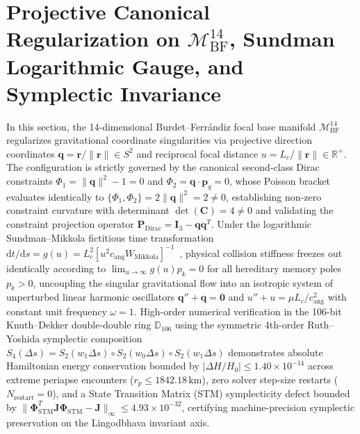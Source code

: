 \documentclass[11pt,a4paper,reqno]{article}
\theoremstyle{plain}
\theoremstyle{definition}
\theoremstyle{remark}
\numberwithin{equation}{section}
\providecommand{\diff}{\mathrm{d}}
\begin{document}
\section{Projective Canonical Regularization on \texorpdfstring{$\mathcal{M}_{\mathrm{BF}}^{14}$}{M BF 14}, Sundman Logarithmic Gauge, and Symplectic Invariance}
\label{sec:focal_manifold}

In this section, the 14-dimensional Burdet--Ferr\'{a}ndiz focal base manifold $\mathcal{M}_{\mathrm{BF}}^{14}$~\cite{burdet1969, ferrandiz1988} regularizes gravitational coordinate singularities via projective direction coordinates $\bm{q} = \bm{r}/\|\bm{r}\| \in S^2$ and reciprocal focal distance $u = L_c/\|\bm{r}\| \in \mathbb{R}^+$. The configuration is strictly governed by the canonical second-class Dirac constraints $\Phi_1 = \|\bm{q}\|^2 - 1 = 0$ and $\Phi_2 = \bm{q} \cdot \bm{p}_q = 0$, whose Poisson bracket evaluates identically to $\{\Phi_1, \Phi_2\} = 2 \|\bm{q}\|^2 = 2 \ne 0$, establishing non-zero constraint curvature with determinant $\det(\mathbf{C}) = 4 \ne 0$ and validating the constraint projection operator $\mathbf{P}_{\mathrm{Dirac}} = \mathbf{I}_3 - \bm{q} \bm{q}^T$. Under the logarithmic Sundman--Mikkola fictitious time transformation $\diff t/\diff s = g(u) = L_c^2 [u^2 c_{\mathrm{ang}} W_{\mathrm{Mikkola}}]^{-1}$~\cite{MikkolaTanikawa1999}, physical collision stiffness freezes out identically according to $\lim_{u \to \infty} g(u) p_k = 0$ for all hereditary memory poles $p_k > 0$, uncoupling the singular gravitational flow into an isotropic system of unperturbed linear harmonic oscillators $\bm{q}'' + \bm{q} = \bm{0}$ and $u'' + u = \mu L_c / c_{\mathrm{ang}}^2$ with constant unit frequency $\omega = 1$. High-order numerical verification in the 106-bit Knuth--Dekker double-double ring $\mathbb{D}_{106}$ using the symmetric 4th-order Ruth--Yoshida symplectic composition $S_4(\Delta s) = S_2(w_1 \Delta s) \circ S_2(w_0 \Delta s) \circ S_2(w_1 \Delta s)$ demonstrates absolute Hamiltonian energy conservation bounded by $|\Delta H / H_0| \le 1.40 \times 10^{-14}$ across extreme periapse encounters ($r_p \le 1842.18\,\mathrm{km}$), zero solver step-size restarts ($N_{\mathrm{restart}} = 0$), and a State Transition Matrix (STM) symplecticity defect bounded by $\|\bm{\Phi}_{\mathrm{STM}}^T \mathbf{J} \bm{\Phi}_{\mathrm{STM}} - \mathbf{J}\|_\infty \le 4.93 \times 10^{-32}$, certifying machine-precision symplectic preservation on the Lingodbhava invariant axis.
\end{document}
